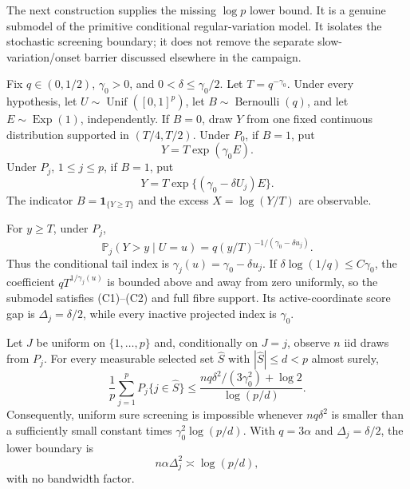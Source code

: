 The next construction supplies the missing $\log p$ lower bound. It is a
genuine submodel of the primitive conditional regular-variation model. It
isolates the stochastic screening boundary; it does not remove the separate
slow-variation/onset barrier discussed elsewhere in the campaign.

Fix $q\in(0,1/2)$, $\gamma_0>0$, and
$0<\delta\le\gamma_0/2$. Let
$T=q^{-\gamma_0}$. Under every hypothesis, let
$U\sim\operatorname{Unif}([0,1]^p)$, let $B\sim\operatorname{Bernoulli}(q)$,
and let $E\sim\operatorname{Exp}(1)$, independently. If $B=0$, draw $Y$
from one fixed continuous distribution supported in $(T/4,T/2)$. Under
$P_0$, if $B=1$, put
\[
 Y=T\exp(\gamma_0E).
\]
Under $P_j$, $1\le j\le p$, if $B=1$, put
\[
 Y=T\exp\{(\gamma_0-\delta U_j)E\}.
\]
The indicator $B=\mathbf 1_{\{Y\ge T\}}$ and the excess
$X=\log(Y/T)$ are observable.

For $y\ge T$, under $P_j$,
\[
 \mathbb P_j(Y>y\mid U=u)
 =q(y/T)^{-1/(\gamma_0-\delta u_j)}.
\]
Thus the conditional tail index is
$\gamma_j(u)=\gamma_0-\delta u_j$. If
$\delta\log(1/q)\le C\gamma_0$, the coefficient
$qT^{1/\gamma_j(u)}$ is bounded above and away from zero uniformly, so the
submodel satisfies (C1)--(C2) and full fibre support. Its active-coordinate
score gap is $\Delta_j=\delta/2$, while every inactive projected index is
$\gamma_0$.

\begin{theorem}
\label{thm:new-list-fano}
Let $J$ be uniform on $\{1,\ldots,p\}$ and, conditionally on $J=j$, observe
$n$ iid draws from $P_j$. For every measurable selected set
$\widehat S$ with $|\widehat S|\le d<p$ almost surely,
\[
 \frac1p\sum_{j=1}^pP_j\{j\in\widehat S\}
 \le
 \frac{nq\delta^2/(3\gamma_0^2)+\log2}{\log(p/d)}.
\]
Consequently, uniform sure screening is impossible whenever
$nq\delta^2$ is smaller than a sufficiently small constant times
$\gamma_0^2\log(p/d)$. With $q=3\alpha$ and
$\Delta_j=\delta/2$, the lower boundary is
\[
 n\alpha\Delta_j^2\asymp\log(p/d),
\]
with no bandwidth factor.
\end{theorem}

